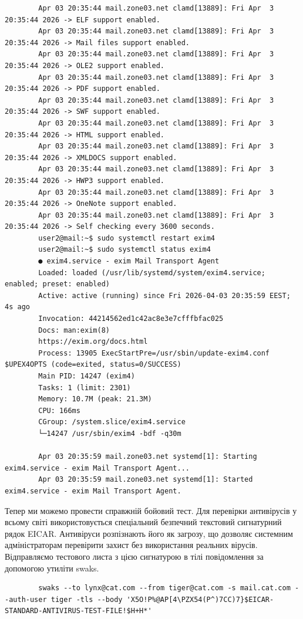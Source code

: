\documentclass[14pt, a4paper]{extreport}
\begin{document}
\begin{verbatim}
		Apr 03 20:35:44 mail.zone03.net clamd[13889]: Fri Apr  3 20:35:44 2026 -> ELF support enabled.
		Apr 03 20:35:44 mail.zone03.net clamd[13889]: Fri Apr  3 20:35:44 2026 -> Mail files support enabled.
		Apr 03 20:35:44 mail.zone03.net clamd[13889]: Fri Apr  3 20:35:44 2026 -> OLE2 support enabled.
		Apr 03 20:35:44 mail.zone03.net clamd[13889]: Fri Apr  3 20:35:44 2026 -> PDF support enabled.
		Apr 03 20:35:44 mail.zone03.net clamd[13889]: Fri Apr  3 20:35:44 2026 -> SWF support enabled.
		Apr 03 20:35:44 mail.zone03.net clamd[13889]: Fri Apr  3 20:35:44 2026 -> HTML support enabled.
		Apr 03 20:35:44 mail.zone03.net clamd[13889]: Fri Apr  3 20:35:44 2026 -> XMLDOCS support enabled.
		Apr 03 20:35:44 mail.zone03.net clamd[13889]: Fri Apr  3 20:35:44 2026 -> HWP3 support enabled.
		Apr 03 20:35:44 mail.zone03.net clamd[13889]: Fri Apr  3 20:35:44 2026 -> OneNote support enabled.
		Apr 03 20:35:44 mail.zone03.net clamd[13889]: Fri Apr  3 20:35:44 2026 -> Self checking every 3600 seconds.
		user2@mail:~$ sudo systemctl restart exim4
		user2@mail:~$ sudo systemctl status exim4
		● exim4.service - exim Mail Transport Agent
		Loaded: loaded (/usr/lib/systemd/system/exim4.service; enabled; preset: enabled)
		Active: active (running) since Fri 2026-04-03 20:35:59 EEST; 4s ago
		Invocation: 44214562ed1c42ac8e3e7cfffbfac025
		Docs: man:exim(8)
		https://exim.org/docs.html
		Process: 13905 ExecStartPre=/usr/sbin/update-exim4.conf $UPEX4OPTS (code=exited, status=0/SUCCESS)
		Main PID: 14247 (exim4)
		Tasks: 1 (limit: 2301)
		Memory: 10.7M (peak: 21.3M)
		CPU: 166ms
		CGroup: /system.slice/exim4.service
		└─14247 /usr/sbin/exim4 -bdf -q30m
		
		Apr 03 20:35:59 mail.zone03.net systemd[1]: Starting exim4.service - exim Mail Transport Agent...
		Apr 03 20:35:59 mail.zone03.net systemd[1]: Started exim4.service - exim Mail Transport Agent.
	\end{verbatim}
	
	Тепер ми можемо провести справжній бойовий тест. Для перевірки антивірусів у всьому світі використовується спеціальний безпечний текстовий сигнатурний рядок EICAR. Антивіруси розпізнають його як загрозу, що дозволяє системним адміністраторам перевірити захист без використання реальних вірусів. Відправляємо тестового листа з цією сигнатурою в тілі повідомлення за допомогою утиліти swaks.
	
	\begin{verbatim}
		swaks --to lynx@cat.com --from tiger@cat.com -s mail.cat.com --auth-user tiger -tls --body 'X5O!P%@AP[4\PZX54(P^)7CC)7}$EICAR-STANDARD-ANTIVIRUS-TEST-FILE!$H+H*'
	\end{verbatim}
	
\end{document}
